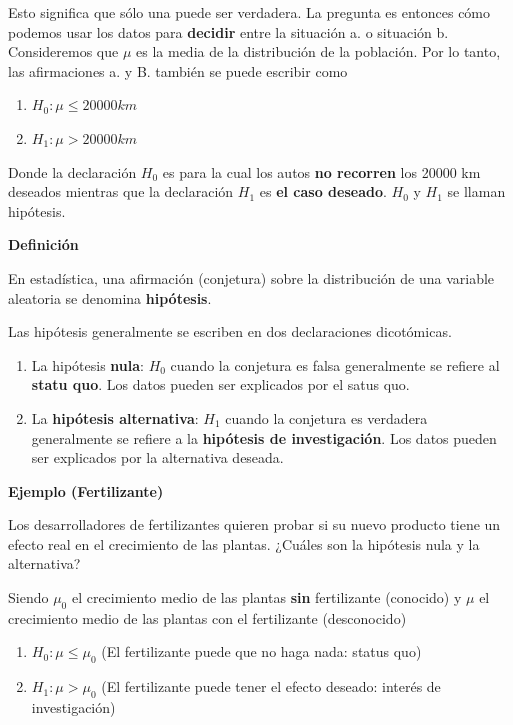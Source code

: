 \documentclass[
]{book}
\providecommand{\tightlist}{%
  \setlength{\itemsep}{0pt}\setlength{\parskip}{0pt}}
\begin{document}
Esto significa que sólo una puede ser verdadera. La pregunta es entonces cómo podemos usar los datos para \textbf{decidir} entre la situación a. o situación b. Consideremos que \(\mu\) es la media de la distribución de la población. Por lo tanto, las afirmaciones a. y B. también se puede escribir como

\begin{enumerate}
\def\labelenumi{\alph{enumi}.}
\tightlist
\item
  \(H_0: \mu \leq 20000km\)
\item
  \(H_1: \mu > 20000km\)
\end{enumerate}

Donde la declaración \(H_0\) es para la cual los autos \textbf{no recorren} los 20000 km deseados mientras que la declaración \(H_1\) es \textbf{el caso deseado}. \(H_0\) y \(H_1\) se llaman hipótesis.

\textbf{Definición}

En estadística, una afirmación (conjetura) sobre la distribución de una variable aleatoria se denomina \textbf{hipótesis}.

Las hipótesis generalmente se escriben en dos declaraciones dicotómicas.

\begin{enumerate}
\def\labelenumi{\alph{enumi}.}
\item
  La hipótesis \textbf{nula}: \(H_0\) cuando la conjetura es falsa generalmente se refiere al \textbf{statu quo}. Los datos pueden ser explicados por el satus quo.
\item
  La \textbf{hipótesis alternativa}: \(H_1\) cuando la conjetura es verdadera generalmente se refiere a la \textbf{hipótesis de investigación}. Los datos pueden ser explicados por la alternativa deseada.
\end{enumerate}

\textbf{Ejemplo (Fertilizante)}

Los desarrolladores de fertilizantes quieren probar si su nuevo producto tiene un efecto real en el crecimiento de las plantas. ¿Cuáles son la hipótesis nula y la alternativa?

Siendo \(\mu_0\) el crecimiento medio de las plantas \textbf{sin} fertilizante (conocido) y \(\mu\) el crecimiento medio de las plantas con el fertilizante (desconocido)

\begin{enumerate}
\def\labelenumi{\alph{enumi}.}
\tightlist
\item
  \(H_0:\mu \leq \mu_0\) (El fertilizante puede que no haga nada: status quo)
\item
  \(H_1:\mu > \mu_0\) (El fertilizante puede tener el efecto deseado: interés de investigación)
\end{enumerate}
\end{document}
